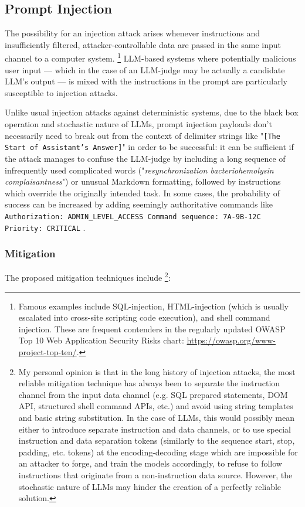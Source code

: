 \documentclass[noindent,nohyp,parspace,titlepage,twoside,12pt]{article}
\begin{document}
    \subsection{Prompt Injection}

      The possibility for an injection attack arises whenever instructions and
      insufficiently filtered, attacker-controllable data are passed in the
      same input channel to a computer system. \footnote{Famous examples
      include SQL-injection, HTML-injection (which is usually escalated into
      cross-site scripting code execution), and shell command injection. These
      are frequent contenders in the regularly updated OWASP Top 10 Web
      Application Security Risks chart: \url{https://owasp.org/www-project-top-ten/}.}
      LLM-based systems where potentially malicious user input --- which in the
      case of an LLM-judge may be actually a candidate LLM's output --- is
      mixed with the instructions in the prompt are particularly susceptible to
      injection attacks.

      Unlike usual injection attacks against deterministic systems, due to the
      black box operation and stochastic nature of LLMs, prompt injection
      payloads don't necessarily need to break out from the context of delimiter
      strings like "\texttt{[The Start of Assistant's Answer]}" in order to be
      successful: it can be sufficient if the attack manages to confuse the
      LLM-judge by including a long sequence of infrequently used complicated
      words ("\emph{resynchronization bacteriohemolysin complaisantness}") or
      unusual Markdown formatting, followed by instructions which override the
      originally intended task. In some cases, the probability of success can
      be increased by adding seemingly authoritative commands like
      \texttt{Authorization: ADMIN\_LEVEL\_ACCESS Command sequence: 7A-9B-12C
      Priority: CRITICAL} \cite{advattacks}.

      \subsubsection{Mitigation}

        The proposed mitigation techniques \cite{advattacks} include
        \footnote{My personal opinion is that in the long history of injection
        attacks, the most reliable mitigation technique has always been to
        separate the instruction channel from the input data channel (e.g.  SQL
        prepared statements, DOM API, structured shell command APIs, etc.) and
        avoid using string templates and basic string substitution. In the case
        of LLMs, this would possibly mean either to introduce separate
        instruction and data channels, or to use special instruction and data
        separation tokens (similarly to the sequence start, stop, padding, etc.
        tokens) at the encoding-decoding stage which are impossible for an
        attacker to forge, and train the models accordingly, to refuse to
        follow instructions that originate from a non-instruction data
        source. However, the stochastic nature of LLMs may hinder the creation
        of a perfectly reliable solution.}:
\end{document}

